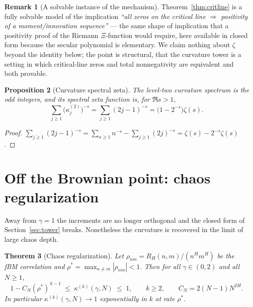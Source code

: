 \documentclass[11pt,reqno]{amsart}
\theoremstyle{plain}
\newtheorem{theorem}{Theorem}[section]
\newtheorem{proposition}[theorem]{Proposition}
\theoremstyle{definition}
\newtheorem{remark}[theorem]{Remark}
\begin{document}
\begin{remark}[A solvable instance of the mechanism]
Theorem~\ref{thm:critline} is a fully solvable model of the implication
\emph{``all zeros on the critical line $\Rightarrow$ positivity of a moment/innovation
sequence''} --- the same shape of implication that a positivity proof of the
Riemann $\Xi$-function would require, here available in closed form because the
secular polynomial is elementary. We claim nothing about $\zeta$ beyond the
identity below; the point is structural, that the curvature tower is a setting in
which critical-line zeros and total nonnegativity are equivalent and both
provable.
\end{remark}

\begin{proposition}[Curvature spectral zeta]\label{prop:zeta}
The level-two curvature spectrum is the odd integers, and its spectral zeta
function is, for $\Re s>1$,
\begin{equation}\label{eq:zeta}
  \sum_{j\ge1}\bigl(\kappa_j^{(2)}\bigr)^{-s}
  =\sum_{j\ge1}(2j-1)^{-s}=\bigl(1-2^{-s}\bigr)\zeta(s).
\end{equation}
\end{proposition}

\begin{proof}
$\sum_{j\ge1}(2j-1)^{-s}=\sum_{n\ge1}n^{-s}-\sum_{j\ge1}(2j)^{-s}
=\zeta(s)-2^{-s}\zeta(s)$.
\end{proof}

\section{Off the Brownian point: chaos regularization}\label{sec:reg}

Away from $\gamma=1$ the increments are no longer orthogonal and the closed form
of Section~\ref{sec:tower} breaks. Nonetheless the curvature is recovered in the
limit of large chaos depth.

\begin{theorem}[Chaos regularization]\label{thm:reg}
Let $\rho_{nm}=R_H(n,m)/(n^{H}m^{H})$ be the fBM correlation and
$\rho^{*}=\max_{n\neq m}|\rho_{nm}|<1$. Then for all $\gamma\in(0,2)$ and all
$N\ge1$,
\begin{equation}\label{eq:reg}
  1-C_N(\rho^{*})^{\,k-1}\;\le\;\kappa^{(k)}(\gamma,N)\;\le\;1,
  \qquad k\ge2,\qquad C_N=2(N-1)N^{2H}.
\end{equation}
In particular $\kappa^{(k)}(\gamma,N)\to1$ exponentially in $k$ at rate
$\rho^{*}$.
\end{theorem}
\end{document}
